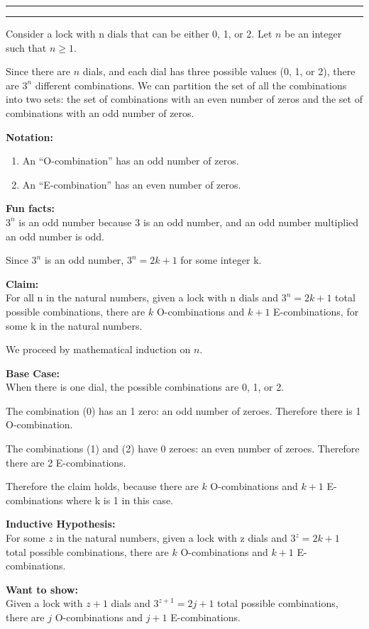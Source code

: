 \documentclass[11pt]{article}
\newcounter{questionCounter}
\newcounter{partCounter}[questionCounter]
\newenvironment{question}[2][\arabic{questionCounter}]{%
    \setcounter{partCounter}{0}%
    \vspace{.25in} \hrule \vspace{0.5em}%
        \noindent{\bf #2}%
    \vspace{0.8em} \hrule \vspace{.10in}%
    \addtocounter{questionCounter}{1}%
}{}
\begin{document}
\begin{question}{In Lament of Locks}
Consider a lock with n dials that can be either 0, 1, or 2. 
Let $n$ be an integer such that $n\geq1$.

Since there are $n$ dials, and each dial has three possible 
values (0, 1, or 2), there are $3^{n}$ different combinations. We can 
partition the set of all the combinations into two sets: the set of 
combinations with an even number of zeros and the set of combinations with an 
odd number of zeros. 

\textbf{Notation:}
\begin{enumerate}
\item An ``O-combination'' has an odd number of zeros.
\item An ``E-combination'' has an even number of zeros.
\end{enumerate}

\textbf{Fun facts:}\\
$3^n$ is an odd number because 3 is an odd number, and an odd number 
multiplied an odd number is odd.

Since $3^n$ is an odd number, $3^n = 2k+1$ for some integer k.

\textbf{Claim:}\\
For all n in the natural numbers, given a lock with n dials and 
$3^n=2k+1$ total possible combinations, there are $k$ O-combinations and $k+1$ 
E-combinations, for some k in the natural numbers.

We proceed by mathematical induction on $n$. 

\textbf{Base Case:}\\
When there is one dial, the possible combinations are 0, 1, or 2. 

The combination (0) has an 1 zero: an odd number of zeroes. Therefore there is 
1 O-combination.

The combinations (1) and (2) have 0 zeroes: an even number of zeroes. Therefore 
there are 2 E-combinations. 

Therefore the claim holds, because there are $k$ O-combinations and $k+1$ 
E-combinations where k is 1 in this case.

\textbf{Inductive Hypothesis:}\\
For some $z$ in the natural numbers, given a lock with z dials and 
$3^z=2k+1$ total possible combinations, there are $k$ O-combinations and $k+1$ 
E-combinations.

\textbf{Want to show:}\\
Given a lock with $z+1$ dials and $3^{z+1}=2j+1$ total possible combinations, there 
are $j$ O-combinations and $j+1$ E-combinations.


\end{question}
\end{document}
